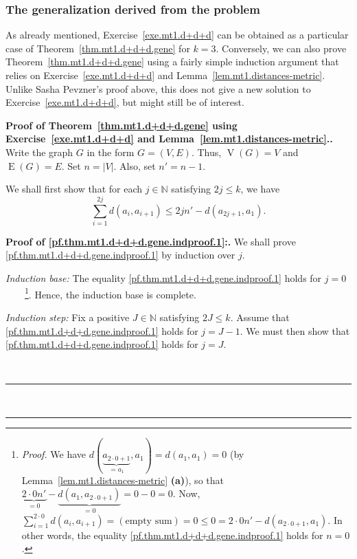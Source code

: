 \documentclass[numbers=enddot,12pt,final,onecolumn,notitlepage]{scrartcl}%
\theoremstyle{definition}
\newenvironment{proof}[1][Proof]{\noindent\textbf{#1.} }{\ \rule{0.5em}{0.5em}}
\let\sumnonlimits\sum
\renewcommand{\sum}{\sumnonlimits\limits}
\newcommand{\NN}{\mathbb{N}}
\newcommand{\abs}[1]{\left| #1 \right|}
\newcommand{\tup}[1]{\left( #1 \right)}
\newcommand{\verts}[1]{\operatorname{V}\left( #1 \right)}
\newcommand{\edges}[1]{\operatorname{E}\left( #1 \right)}
\begin{document}
\subsubsection{The generalization derived from the problem}

As already mentioned, Exercise~\ref{exe.mt1.d+d+d} can be obtained
as a particular case of Theorem~\ref{thm.mt1.d+d+d.gene} for $k = 3$.
Conversely, we can also prove Theorem~\ref{thm.mt1.d+d+d.gene} using
a fairly simple induction argument that relies on
Exercise~\ref{exe.mt1.d+d+d} and Lemma~\ref{lem.mt1.distances-metric}.
Unlike Sasha Pevzner's proof above, this does not give a new solution
to Exercise~\ref{exe.mt1.d+d+d}, but might still be of interest.

\begin{proof}[Proof of Theorem~\ref{thm.mt1.d+d+d.gene} using
Exercise~\ref{exe.mt1.d+d+d} and
Lemma~\ref{lem.mt1.distances-metric}.]
Write the graph $G$ in the form $G = \tup{V, E}$.
Thus, $\verts{G} = V$ and $\edges{G} = E$.
Set $n = \abs{V}$.
Also, set $n' = n-1$.

We shall first show that for each $j \in \NN$ satisfying $2j \leq k$,
we have
\begin{equation}
\sum_{i=1}^{2j} d \tup{a_i, a_{i+1}}
\leq 2j n' - d \tup{a_{2j+1}, a_1} .
\label{pf.thm.mt1.d+d+d.gene.indproof.1}
\end{equation}

\begin{proof}[Proof of \eqref{pf.thm.mt1.d+d+d.gene.indproof.1}:]
We shall prove \eqref{pf.thm.mt1.d+d+d.gene.indproof.1} by induction
over $j$.

\textit{Induction base:} The equality
\eqref{pf.thm.mt1.d+d+d.gene.indproof.1} holds for
$j = 0$\ \ \ \ \footnote{\textit{Proof.} We have
$d \tup{\underbrace{a_{2\cdot 0+1}}_{= a_1}, a_1}
= d \tup{a_1, a_1} = 0$
(by Lemma~\ref{lem.mt1.distances-metric} \textbf{(a)}), so that
$\underbrace{2 \cdot 0 n'}_{= 0}
- \underbrace{d \tup{a_1, a_{2\cdot 0+1}}}_{= 0}
= 0 - 0 = 0$. Now,
$\sum_{i=1}^{2\cdot 0} d \tup{a_i, a_{i+1}}
= \tup{\text{empty sum}} = 0
\leq 0 = 2 \cdot 0 n' - d \tup{a_{2\cdot 0+1}, a_1}$.
In other words, the equality
\eqref{pf.thm.mt1.d+d+d.gene.indproof.1} holds for $n = 0$.}.
Hence, the induction base is complete.

\textit{Induction step:} Fix a positive $J \in \NN$ satisfying
$2J \leq k$.
Assume that \eqref{pf.thm.mt1.d+d+d.gene.indproof.1} holds for
$j = J-1$.
We must then show that \eqref{pf.thm.mt1.d+d+d.gene.indproof.1} holds
for $j = J$.


\end{proof}
\end{proof}
\end{document}
